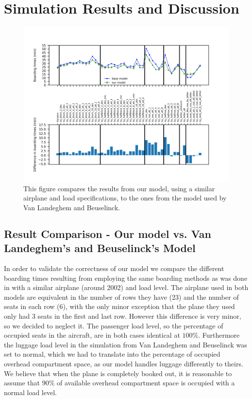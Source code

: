 \documentclass[11pt]{article}
\begin{document}
\section{Simulation Results and Discussion}
\begin{figure}
	\includegraphics[width=\linewidth]{../../code/AirplaneBoarding/data/figure1/figure1.png}
	\caption{This figure compares the results from our model, using a similar airplane and load specifications, to the ones from the model used by Van Landeghem and Beuselinck.}
	\label{figure1}
\end{figure}
\subsection{Result Comparison - Our model vs. Van Landeghem's and Beuselinck's Model}
In order to validate the correctness of our model we compare the different boarding times resulting from employing the same boarding methods as was done in \cite{beus} with a similar airplane (around 2002) and load level. The airplane used in both models are equivalent in the number of rows they have (23) and the number of seats in each row (6), with the only minor exception that the plane they used only had 3 seats in the first and last row. However this difference is very minor, so we decided to neglect it. The passenger load level, so the percentage of occupied seats in the aircraft, are in both cases identical at $100\%$. Furthermore the luggage load level in the simulation from Van Landeghem and Beuselinck was set to normal, which we had to translate into the percentage of occupied overhead compartment space, as our model handles luggage differently to theirs. We believe that when the plane is completely booked out, it is reasonable to assume that $90\%$ of available overhead compartment space is occupied with a normal load level.
\end{document}

